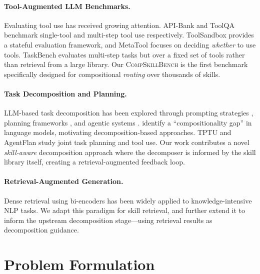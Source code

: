 \documentclass[11pt]{article}
\newcommand{\benchmark}{\textsc{CompSkillBench}}
\begin{document}
\paragraph{Tool-Augmented LLM Benchmarks.}
Evaluating tool use has received growing attention.
API-Bank \cite{li2023apibank} and ToolQA \cite{zhuang2024toolqa} benchmark single-tool and multi-step tool use respectively.
ToolSandbox \cite{lu2024toolsandbox} provides a stateful evaluation framework, and MetaTool \cite{huang2024metatool} focuses on deciding \emph{whether} to use tools.
TaskBench \cite{shen2023taskbench} evaluates multi-step tasks but over a fixed set of tools rather than retrieval from a large library.
Our \benchmark{} is the first benchmark specifically designed for compositional \emph{routing} over thousands of skills.

\paragraph{Task Decomposition and Planning.}
LLM-based task decomposition has been explored through prompting strategies \cite{wei2022chain,zhou2022least,khot2023decomposed}, planning frameworks \cite{huang2022language,wang2023plan}, and agentic systems \cite{yao2023react,shinn2023reflexion}.
\citet{press2023measuring} identify a ``compositionality gap'' in language models, motivating decomposition-based approaches.
TPTU \cite{ruan2024tptu} and AgentFlan \cite{chen2024agentflan} study joint task planning and tool use.
Our work contributes a novel \emph{skill-aware} decomposition approach where the decomposer is informed by the skill library itself, creating a retrieval-augmented feedback loop.

\paragraph{Retrieval-Augmented Generation.}
Dense retrieval using bi-encoders \cite{karpukhin2020dense,ni2022sentence} has been widely applied to knowledge-intensive NLP tasks.
We adapt this paradigm for skill retrieval, and further extend it to inform the upstream decomposition stage---using retrieval results as decomposition guidance.

\section{Problem Formulation}
\label{sec:problem}
\end{document}
